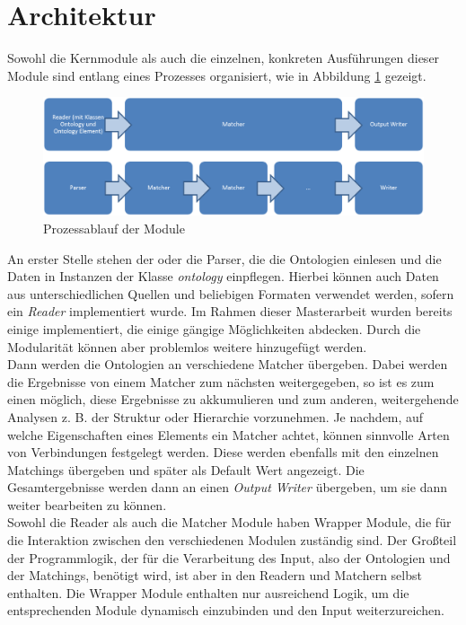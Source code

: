 		\section{Architektur}
		Sowohl die Kernmodule als auch die einzelnen, konkreten Ausführungen dieser
		Module sind entlang eines Prozesses organisiert, wie in Abbildung \ref{fig2}
		gezeigt.
		\begin{figure}[h!]
		\centering
		\includegraphics[width=1.0\textwidth]{pics/Module-overview.png}
		\caption{Prozessablauf der Module}
		\label{fig2}
		\end{figure}
		An erster Stelle stehen der oder die Parser, die die Ontologien einlesen und
		die Daten in Instanzen der Klasse \textit{ontology} einpflegen. Hierbei können
		auch Daten aus unterschiedlichen Quellen und beliebigen Formaten verwendet
		werden, sofern ein \textit{Reader} implementiert wurde. Im Rahmen dieser
		Masterarbeit wurden bereits einige implementiert, die einige gängige
		Möglichkeiten abdecken. Durch die Modularität können aber problemlos weitere
		hinzugefügt werden.\\
		Dann werden die Ontologien an verschiedene Matcher übergeben. Dabei werden
		die Ergebnisse von einem Matcher zum nächsten weitergegeben, so ist es zum
		einen möglich, diese Ergebnisse zu akkumulieren und zum
		anderen, weitergehende Analysen z. B. der Struktur oder Hierarchie vorzunehmen. Je nachdem, auf welche Eigenschaften
		eines Elements ein Matcher achtet, können sinnvolle Arten von Verbindungen
		festgelegt werden. Diese werden ebenfalls mit den einzelnen Matchings
		übergeben und später als Default Wert angezeigt. Die Gesamtergebnisse werden
		dann an einen \textit{Output Writer} übergeben, um sie dann weiter bearbeiten zu können.\\
		Sowohl die Reader als auch die Matcher Module haben Wrapper Module, die für
		die Interaktion zwischen den verschiedenen Modulen zuständig sind. Der
		Großteil der Programmlogik, der für die Verarbeitung des Input, also der
		Ontologien und der Matchings, benötigt wird, ist aber in den Readern und
		Matchern selbst enthalten. Die Wrapper Module enthalten nur ausreichend Logik,
		um die entsprechenden Module dynamisch einzubinden und den Input weiterzureichen.
		
